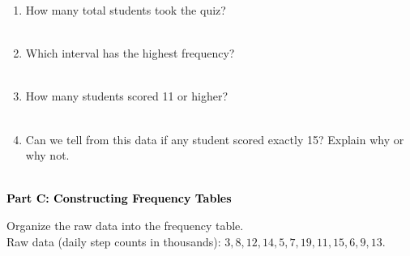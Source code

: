 \documentclass[12pt, letterpaper, fleqn]{article}
\begin{document}
\vspace{5mm}

\begin{enumerate}[itemsep=2.2cm, leftmargin=0.6cm]
\item How many total students took the quiz? \\ \\

\item Which interval has the highest frequency? \\ \\

\item How many students scored 11 or higher? \\ \\

\item Can we tell from this data if any student scored exactly 15? Explain why or why not. \\ \\

\end{enumerate}

\newpage

\begin{tcolorbox}[colback=black!10]
    \large\textcolor{black}{\textbf{Part C: Constructing Frequency Tables}}
\end{tcolorbox}

\vspace{3mm}

\noindent
Organize the raw data into the frequency table. \\
Raw data (daily step counts in thousands): $3, 8, 12, 14, 5, 7, 19, 11, 15, 6, 9, 13$.

\vspace{5mm}
\end{document}
